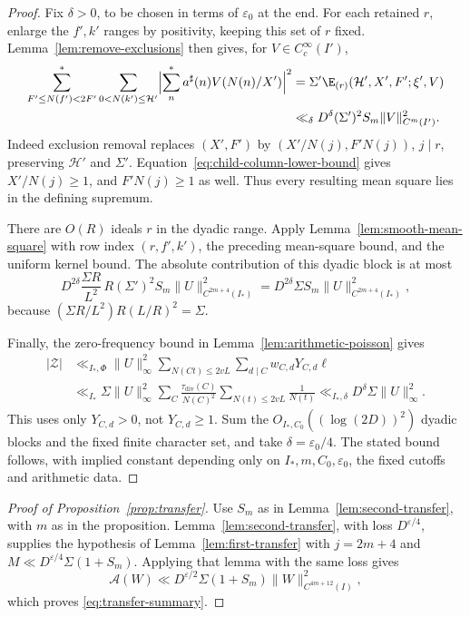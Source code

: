 \begin{proof}
Fix $\delta>0$, to be chosen in terms of $\varepsilon_0$ at the end.
For each retained $r$, enlarge the $f',k'$ ranges by positivity,
keeping this set of $r$ fixed. Lemma~\ref{lem:remove-exclusions}
then gives, for $V\in C_c^\infty(I')$,
\[
 \begin{aligned}
 \sum_{F'\le N(f')<2F'}^*\sum_{0<N(k')\le\mathcal H'}
 \Bigl|\sum_n^*a^\sharp(n)V(N(n)/X')\Bigr|^2
 &=\Sigma'\E_{(r)}(\mathcal H',X',F';\xi',V)\\
 &\ll_\delta D^\delta(\Sigma')^2S_m
                  \|V\|_{C^m(I')}^2.
 \end{aligned}
\]
Indeed exclusion removal replaces $(X',F')$ by
$(X'/N(j),F'N(j))$, $j\mid r$, preserving $\mathcal H'$ and $\Sigma'$.
Equation~\eqref{eq:child-column-lower-bound} gives $X'/N(j)\ge1$,
and $F'N(j)\ge1$ as well. Thus every resulting mean square lies in
the defining supremum.

There are $O(R)$ ideals $r$ in the dyadic range.
Apply Lemma~\ref{lem:smooth-mean-square} with row index
$(r,f',k')$, the preceding mean-square bound, and the uniform kernel bound.
The absolute contribution of this dyadic block is at most
\[
 D^{2\delta}\frac{\Sigma R}{L^2}\,
 R(\Sigma')^2S_m\|U\|_{C^{2m+4}(I_*)}^2
 =D^{2\delta}\Sigma S_m\|U\|_{C^{2m+4}(I_*)}^2,
\]
because $(\Sigma R/L^2)R(L/R)^2=\Sigma$.

Finally, the zero-frequency bound in Lemma~\ref{lem:arithmetic-poisson} gives
\[
 \begin{aligned}
 |\mathcal Z|
 &\ll_{I_*,\Phi}\|U\|_\infty^2
     \sum_{N(Ct)\le 2vL}\sum_{d\mid C}w_{C,d}Y_{C,d}\ell\\
 &\ll_{I_*}\Sigma\|U\|_\infty^2
     \sum_C\frac{\tau_{\mathrm{div}}(C)}{N(C)^2}
     \sum_{N(t)\le 2vL}\frac1{N(t)}
 \ll_{I_*,\delta}D^\delta\Sigma\|U\|_\infty^2.
 \end{aligned}
\]
This uses only $Y_{C,d}>0$, not $Y_{C,d}\ge1$.
Sum the $O_{I_*,C_0}((\log(2D))^2)$ dyadic blocks and the fixed
finite character set, and take $\delta=\varepsilon_0/4$.
The stated bound follows, with implied constant depending only on
$I_*,m,C_0,\varepsilon_0$, the fixed cutoffs and arithmetic data.
\end{proof}

\begin{proof}[Proof of Proposition~\ref{prop:transfer}]
Use $S_m$ as in Lemma~\ref{lem:second-transfer}, with $m$ as in the proposition.
Lemma~\ref{lem:second-transfer}, with loss $D^{\varepsilon/4}$,
supplies the hypothesis of Lemma~\ref{lem:first-transfer} with
$j=2m+4$ and $M\ll D^{\varepsilon/4}\Sigma(1+S_m)$.
Applying that lemma with the same loss gives
\[
 \mathcal A(W)\ll D^{\varepsilon/2}\Sigma(1+S_m)
       \|W\|_{C^{4m+12}(I)}^2,
\]
which proves \eqref{eq:transfer-summary}.
\end{proof}


